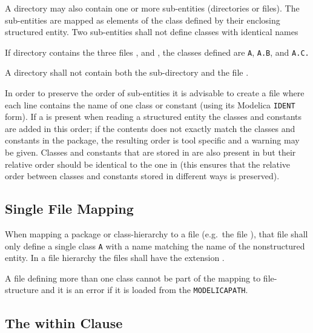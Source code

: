 A directory may also contain one or more sub-entities (directories or
files). The sub-entities are mapped as elements of the class defined by
their enclosing structured entity.  Two sub-entities shall not define classes with identical names

\begin{example}
If directory  contains the three files ,  and , the classes defined are \lstinline!A!,
\lstinline!A.B!, and \lstinline!A.C.!
\end{example}

\begin{example}
A directory shall not contain both the sub-directory  and the file .
\end{example}

In order to preserve the order of sub-entities it is advisable to create
a file  where each line contains the name of one class or
constant (using its Modelica \lstinline!IDENT! form). If a  is present when reading a structured entity
the classes and constants are added in this order; if the contents does
not exactly match the classes and constants in the package, the
resulting order is tool specific and a warning may be given. Classes and
constants that are stored in  are also present in
 but their relative order should be identical to the one in
 (this ensures that the relative order between classes and
constants stored in different ways is preserved).

\subsection{Single File Mapping}\label{mapping-a-package-class-hierarchy-into-a-single-file-nonstructured-entity}\label{single-file-mapping}

When mapping a package or class-hierarchy to a file (e.g.\ the file ), that file shall only define a single class \lstinline!A! with a
name matching the name of the nonstructured entity. In a file hierarchy the files shall have the extension .

A  file defining more than one class cannot be part of the mapping
to file-structure and it is an error if it is loaded from the
\lstinline!MODELICAPATH!.

\subsection{The within Clause}\label{the-within-clause}


